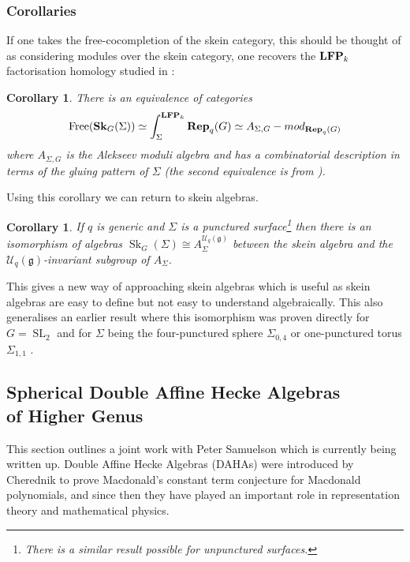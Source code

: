 \documentclass{article}
\newcommand{\catname}[1]{{\normalfont\textbf{#1}}}
\newcommand{\LFP}{\catname{LFP}}
\newcommand{\SK}{\catname{Sk}}
\newcommand{\Rep}{\catname{Rep}}
\newcommand{\Sk}{\operatorname{Sk}}
\newcommand{\Free}{\operatorname{Free}}
\newcommand{\SL}{\operatorname{SL}}
\newtheorem{cor}[thm]{Corollary}
\begin{document}
\subsubsection{Corollaries}

If one takes the free-cocompletion of the skein category, this should be thought of as considering modules over the skein category, one recovers the $\LFP_k$ factorisation homology studied in \cite{david1}:

\begin{cor}\textup{\cite{C2}}
There is an equivalence of categories 
\[
\Free(\SK_G(\Sigma)) \simeq \int_{\Sigma}^{\LFP_k} \Rep_q(G) \simeq A_{\Sigma, G}-mod_{\Rep_q(G)}
\]
where $A_{\Sigma, G}$ is the Alekseev moduli algebra and has a combinatorial description in terms of the gluing pattern of $\Sigma$ (the second equivalence is from \cite{david1}). 
\end{cor}

Using this corollary we can return to skein algebras.

\begin{cor}\textup{\cite{C2}}
If $q$ is generic and $\Sigma$ is a punctured surface\footnote{There is a similar result possible for unpunctured surfaces.} then there is an isomorphism of algebras $\Sk_G(\Sigma) \cong A_{\Sigma}^{\mathcal{U}_q(\mathfrak{g})}$ between the skein algebra and the $\mathcal{U}_q(\mathfrak{g})$-invariant subgroup of $A_{\Sigma}$.  
\end{cor}

This gives a new way of approaching skein algebras which is useful as skein algebras are easy to define but not easy to understand algebraically.
This also generalises an earlier result where this isomorphism was proven directly for $G=\SL_2$ and for $\Sigma$ being the four-punctured sphere $\Sigma_{0,4}$ or one-punctured torus $\Sigma_{1,1}$ \cite{C1}. 

\subsection{Spherical Double Affine Hecke Algebras \\ of Higher Genus}
\label{sec:DAHAs}

This section outlines a joint work with Peter Samuelson which is currently being written up.
Double Affine Hecke Algebras (DAHAs) were introduced by Cherednik to prove Macdonald's constant term conjecture for Macdonald polynomials, and since then they have played an important role in representation theory and mathematical physics. 
\end{document}
